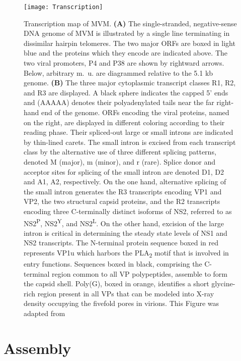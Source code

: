        

\begin{figure}[H]
\centering
  \texttt{[image: Transcription]}
  \caption[Transcription map of MVM]
   {Transcription map of MVM. \textbf{(A)} The single-stranded, negative-sense DNA genome of MVM is illustrated by a single line terminating in dissimilar hairpin telomeres. The two major ORFs are boxed in light blue and the proteins which they encode are indicated above. The two viral promoters, P4 and P38 are shown by rightward arrows. Below, arbitrary m.~u. are diagrammed relative to the 5.1 kb genome. \textbf{(B)} The three major cytoplasmic transcript classes R1, R2, and R3 are displayed. A black sphere indicates the capped 5’ ends and (AAAAA) denotes their polyadenylated tails near the far right-hand end of the genome. ORFs encoding the viral proteins, named on the right, are displayed in different coloring according to their reading phase. Their spliced-out large or small introns are indicated by thin-lined carets. The small intron is excised from each transcript class by the alternative use of three different splicing patterns, denoted M (major), m (minor), and r (rare). Splice donor and acceptor sites for splicing of the small intron are denoted D1, D2 and A1, A2, respectively. On the one hand, alternative splicing of the small intron generates the R3 transcripts encoding VP1 and VP2, the two structural capsid proteins, and the R2 transcripts encoding three C-terminally distinct isoforms of NS2, referred to as NS2\textsuperscript{P}, NS2\textsuperscript{Y}, and NS2\textsuperscript{L}. On the other hand, excision of the large intron is critical in determining the steady state levels of NS1 and NS2 transcripts. The N-terminal protein sequence boxed in red represents VP1u which harbors the PLA\textsubscript{2} motif that is involved in entry functions. Sequences boxed in black, comprising the C-terminal region common to all VP polypeptides, assemble to form the capsid shell. Poly(G), boxed in orange, identifies a short glycine-rich region present in all VPs that can be modeled into X-ray density occupying the fivefold pores in virions. This Figure was adapted from \cite{small}}
\label{Transcription}
\end{figure}       




\section{Assembly}
\label{Assembly}

